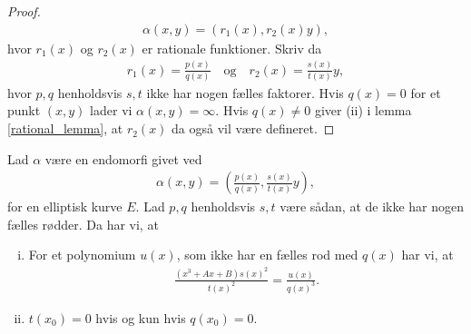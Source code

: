 \begin{proof}
\begin{align*}
		\alpha(x, y) = (r_1(x), r_2(x)y),
\end{align*}
hvor $r_1(x)$ og $r_2(x)$ er rationale funktioner. Skriv da
\begin{align*}
	r_1(x) = \frac{p(x)}{q(x)} \quad \text{og} \quad r_2(x)=\frac{s(x)}{t(x)}y,
\end{align*}
hvor $p, q$ henholdsvis $s, t$ ikke har nogen fælles faktorer. Hvis $q(x)=0$ for et punkt $(x, y)$ lader vi 
$\alpha(x, y) = \infty$. Hvis $q(x) \neq 0$ giver (ii) i lemma \ref{rational_lemma}, at $r_2(x)$ da også vil være defineret.
\end{proof}

\begin{lemma}
\label{rational_lemma}
Lad $\alpha$ være en endomorfi givet ved
\begin{align*}
	\alpha(x, y) = \left( \frac{p(x)}{q(x)}, \frac{s(x)}{t(x)}y \right),
\end{align*}
for en elliptisk kurve $E$. Lad $p, q$ henholdsvis $s, t$ være sådan, at de ikke har nogen fælles rødder. Da har vi, at
\begin{enumerate}[(i)]
	\item For et polynomium $u(x)$, som ikke har en fælles rod med $q(x)$ har vi, at
	\begin{align*}
		\frac{(x^3+Ax+B)s(x)^2}{t(x)^2} = \frac{u(x)}{q(x)^3}.
	\end{align*}
	\item $t(x_0)=0$ hvis og kun hvis $q(x_0)=0$.
\end{enumerate}
\end{lemma}
